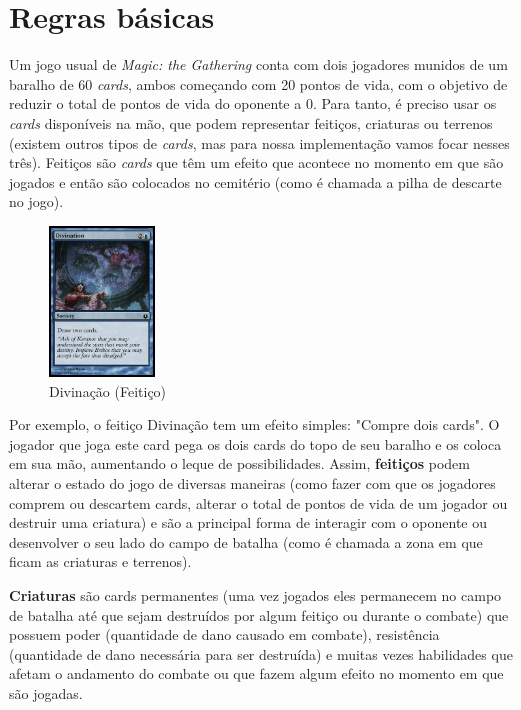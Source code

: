 \documentclass{book}
\begin{document}
\section{Regras básicas}

Um jogo usual de \textit{Magic: the Gathering} conta com dois jogadores
munidos de um baralho de 60 \textit{cards}, ambos começando com 20
pontos de vida, com o objetivo de reduzir o total de pontos de vida do
oponente a 0. Para tanto, é preciso usar os \textit{cards} disponíveis
na mão, que podem representar feitiços, criaturas ou terrenos (existem
outros tipos de \textit{cards}, mas para nossa implementação vamos focar
nesses três). Feitiços são \textit{cards} que têm um efeito que acontece
no momento em que são jogados e então são colocados no cemitério (como é
chamada a pilha de descarte no jogo).\\

\begin{figure}
    \centering
    \includegraphics[width=0.25\textwidth]{picstcc/divination.jpg}
    \caption{Divinação (Feitiço)}
    \label{divination}
\end{figure}

Por exemplo, o feitiço Divinação tem um efeito simples: "Compre dois
cards". O jogador que joga este card pega os dois cards do topo de seu
baralho e os coloca em sua mão, aumentando o leque de possibilidades.
Assim, \textbf{feitiços} podem alterar o estado do jogo de diversas
maneiras (como fazer com que os jogadores comprem ou descartem cards,
alterar o total de pontos de vida de um jogador ou destruir uma
criatura) e são a principal forma de interagir com o oponente ou
desenvolver o seu lado do campo de batalha (como é chamada a zona em que
ficam as criaturas e terrenos).

\textbf{Criaturas} são cards permanentes (uma vez jogados eles
permanecem no campo de batalha até que sejam destruídos por algum
feitiço ou durante o combate) que possuem poder (quantidade de dano
causado em combate), resistência (quantidade de dano necessária para ser
destruída) e muitas vezes habilidades que afetam o andamento do combate
ou que fazem algum efeito no momento em que são jogadas.
\end{document}
